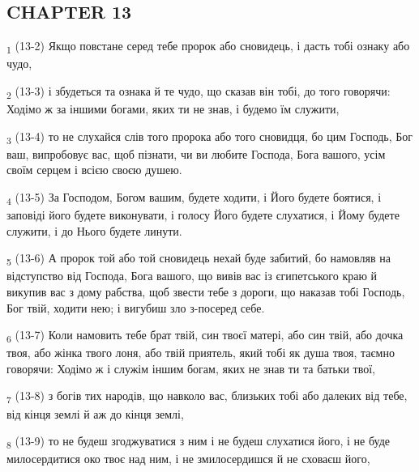 \subsection{CHAPTER 13}
\begin{tcolorbox}
\textsubscript{1} (13-2) Якщо повстане серед тебе пророк або сновидець, і дасть тобі ознаку або чудо,
\end{tcolorbox}
\begin{tcolorbox}
\textsubscript{2} (13-3) і збудеться та ознака й те чудо, що сказав він тобі, до того говорячи: Ходімо ж за іншими богами, яких ти не знав, і будемо їм служити,
\end{tcolorbox}
\begin{tcolorbox}
\textsubscript{3} (13-4) то не слухайся слів того пророка або того сновидця, бо цим Господь, Бог ваш, випробовує вас, щоб пізнати, чи ви любите Господа, Бога вашого, усім своїм серцем і всією своєю душею.
\end{tcolorbox}
\begin{tcolorbox}
\textsubscript{4} (13-5) За Господом, Богом вашим, будете ходити, і Його будете боятися, і заповіді його будете виконувати, і голосу Його будете слухатися, і Йому будете служити, і до Нього будете линути.
\end{tcolorbox}
\begin{tcolorbox}
\textsubscript{5} (13-6) А пророк той або той сновидець нехай буде забитий, бо намовляв на відступство від Господа, Бога вашого, що вивів вас із єгипетського краю й викупив вас з дому рабства, щоб звести тебе з дороги, що наказав тобі Господь, Бог твій, ходити нею; і вигубиш зло з-посеред себе.
\end{tcolorbox}
\begin{tcolorbox}
\textsubscript{6} (13-7) Коли намовить тебе брат твій, син твоєї матері, або син твій, або дочка твоя, або жінка твого лоня, або твій приятель, який тобі як душа твоя, таємно говорячи: Ходімо ж і служім іншим богам, яких не знав ти та батьки твої,
\end{tcolorbox}
\begin{tcolorbox}
\textsubscript{7} (13-8) з богів тих народів, що навколо вас, близьких тобі або далеких від тебе, від кінця землі й аж до кінця землі,
\end{tcolorbox}
\begin{tcolorbox}
\textsubscript{8} (13-9) то не будеш згоджуватися з ним і не будеш слухатися його, і не буде милосердитися око твоє над ним, і не змилосердишся й не сховаєш його,
\end{tcolorbox}
